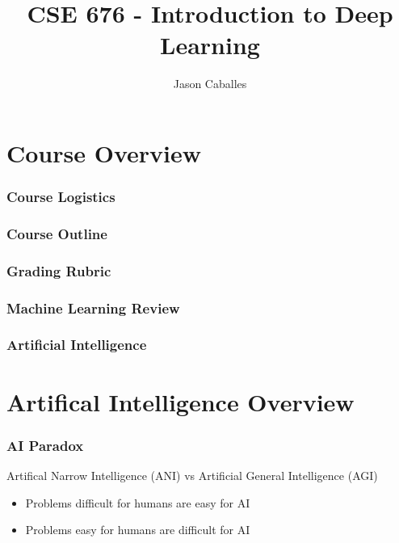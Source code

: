 \documentclass[12pt]{article}
\title{
  CSE 676 - Introduction to Deep Learning
}
\author{
  Jason Caballes
}
\begin{document}



\begin{comment}
\tableofcontents
\newpage
\end{comment}

\section*{Course Overview}
\subsubsection*{Course Logistics}
\subsubsection*{Course Outline}
\subsubsection*{Grading Rubric}
\subsubsection*{Machine Learning Review}
\subsubsection*{Artificial Intelligence}

\section{Artifical Intelligence Overview}
\subsubsection{AI Paradox}
Artifical Narrow Intelligence (ANI) vs Artificial General Intelligence (AGI)

\begin{itemize}
  \item Problems difficult for humans are easy for AI
  \item Problems easy for humans are difficult for AI
\end{itemize}
\end{document}
